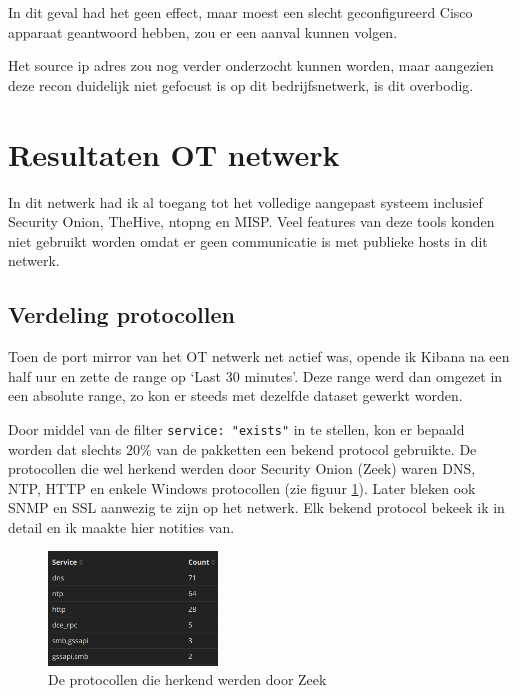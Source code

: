 \documentclass[a4paper, 12pt]{report}
\begin{document}
In dit geval had het geen effect, maar moest een slecht geconfigureerd Cisco apparaat geantwoord hebben, zou er een aanval kunnen volgen.

Het source ip adres zou nog verder onderzocht kunnen worden, maar aangezien deze recon duidelijk niet gefocust is op dit bedrijfsnetwerk, is dit overbodig.


\section{Resultaten OT netwerk}
In dit netwerk had ik al toegang tot het volledige aangepast systeem inclusief Security Onion, TheHive, ntopng en MISP.
Veel features van deze tools konden niet gebruikt worden omdat er geen communicatie is met publieke hosts in dit netwerk.

\subsection{Verdeling protocollen}
Toen de port mirror van het OT netwerk net actief was, opende ik Kibana na een half uur en zette de range op `Last 30 minutes'.
Deze range werd dan omgezet in een absolute range, zo kon er steeds met dezelfde dataset gewerkt worden.

Door middel van de filter \lstinline|service: "exists"| in te stellen, kon er bepaald worden dat slechts $20\%$ van de pakketten een bekend protocol gebruikte.
De protocollen die wel herkend werden door Security Onion (Zeek) waren DNS, NTP, HTTP en enkele Windows protocollen (zie figuur \ref{fig:analyse-ot-stats-services}).
Later bleken ook SNMP en SSL aanwezig te zijn op het netwerk.
Elk bekend protocol bekeek ik in detail en ik maakte hier notities van.

\begin{figure}[H]
  \centering
  \includegraphics[width=0.4\textwidth]{analyse-ot-stats-services}
  \caption{De protocollen die herkend werden door Zeek}
  \label{fig:analyse-ot-stats-services}
\end{figure}
\end{document}
